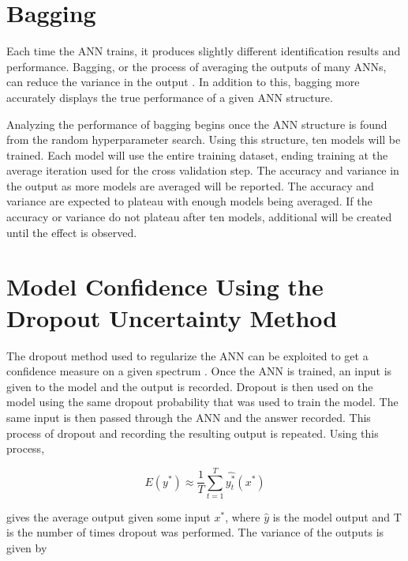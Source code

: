 \documentclass[tocnosub,noragright,centerchapter,12pt,fullpage]{uiucecethesis09}
\begin{document}
\section{Bagging} \label{Bagging}
Each time the ANN trains, it produces slightly different identification results and performance. Bagging, or the process of averaging the outputs of many ANNs, can reduce the variance in the output \cite{Breiman1996}. In addition to this, bagging more accurately displays the true performance of a given ANN structure.

Analyzing the performance of bagging begins once the ANN structure is found from the random hyperparameter search. Using this structure, ten models will be trained. Each model will use the entire training dataset, ending training at the average iteration used for the cross validation step. The accuracy and variance in the output as more models are averaged will be reported. The accuracy and variance are expected to plateau with enough models being averaged. If the accuracy or variance do not plateau after ten models, additional will be created until the effect is observed.



\section{Model Confidence Using the Dropout Uncertainty Method} \label{ModelConfidence}

The dropout method used to regularize the ANN can be exploited to get a confidence measure on a given spectrum \cite{Yarin2016}. Once the ANN is trained, an input is given to the model and the output is recorded. Dropout is then used on the model using the same dropout probability that was used to train the model. The same input is then passed through the ANN and the answer recorded. This process of dropout and recording the resulting output is repeated. Using this process, 

\begin{equation} \label{eq:update1}
E (y^{*}) \approx \frac{1}{T} \sum^{T}_{t=1} \hat{y^{*}_t} (x^{*})
\end{equation}

gives the average output given some input $x^{*}$, where $\hat{y}$ is the model output and T is the number of times dropout was performed. The variance of the outputs is given by 
\end{document}
